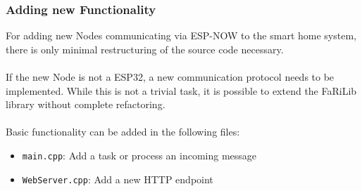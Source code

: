         \subsubsection{Adding new Functionality}
        For adding new Nodes communicating via ESP-NOW to the smart 
        home system, there is only minimal restructuring of the
        source code necessary. \\~\\
        If the new Node is not a ESP32, a new communication protocol
        needs to be implemented. While this is not a trivial task,
        it is possible to extend the FaRiLib library without complete
        refactoring. \\~\\
        Basic functionality can be added in the following files:
        \begin{itemize}
            \item \texttt{main.cpp}: Add a task or process an 
            incoming message
            \item \texttt{WebServer.cpp}: Add a new HTTP endpoint
        \end{itemize}
        